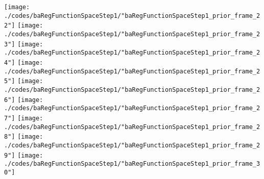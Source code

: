 \begin{frame}{\insertsection}
\begin{center}
{\begin{animateinline}{15}
				 \texttt{[image: ./codes/baRegFunctionSpaceStep1/"baRegFunctionSpaceStep1\_prior\_frame\_22"]}\newframe
				 \texttt{[image: ./codes/baRegFunctionSpaceStep1/"baRegFunctionSpaceStep1\_prior\_frame\_23"]}\newframe
				 \texttt{[image: ./codes/baRegFunctionSpaceStep1/"baRegFunctionSpaceStep1\_prior\_frame\_24"]}\newframe
				 \texttt{[image: ./codes/baRegFunctionSpaceStep1/"baRegFunctionSpaceStep1\_prior\_frame\_25"]}\newframe
				 \texttt{[image: ./codes/baRegFunctionSpaceStep1/"baRegFunctionSpaceStep1\_prior\_frame\_26"]}\newframe
				 \texttt{[image: ./codes/baRegFunctionSpaceStep1/"baRegFunctionSpaceStep1\_prior\_frame\_27"]}\newframe
				 \texttt{[image: ./codes/baRegFunctionSpaceStep1/"baRegFunctionSpaceStep1\_prior\_frame\_28"]}\newframe
				 \texttt{[image: ./codes/baRegFunctionSpaceStep1/"baRegFunctionSpaceStep1\_prior\_frame\_29"]}\newframe
				 \texttt{[image: ./codes/baRegFunctionSpaceStep1/"baRegFunctionSpaceStep1\_prior\_frame\_30"]}
			 \end{animateinline}
			}
	\end{center}
    
\end{frame}

